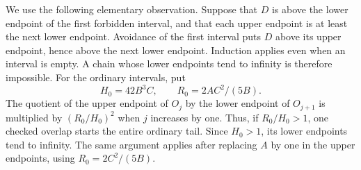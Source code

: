 \documentclass[12pt]{article}
\numberwithin{equation}{section}
\begin{document}
We use the following elementary observation. Suppose that $D$ is
above the lower endpoint of the first forbidden interval, and that
each upper endpoint is at least the next lower endpoint. Avoidance
of the first interval puts $D$ above its upper endpoint, hence above
the next lower endpoint. Induction applies even when an interval is
empty. A chain whose lower endpoints tend to infinity is therefore
impossible.
For the ordinary intervals, put
\[
 H_0=42B^3C,\qquad R_0=2AC^2/(5B).
\]
The quotient of the upper endpoint of $O_j$ by the lower endpoint
of $O_{j+1}$ is multiplied by $(R_0/H_0)^2$ when $j$ increases by one.
Thus, if $R_0/H_0>1$, one checked overlap starts the entire ordinary
tail. Since $H_0>1$, its lower endpoints tend to infinity.
The same argument applies after replacing $A$ by one in the upper
endpoints, using $R_0=2C^2/(5B)$.
\end{document}
